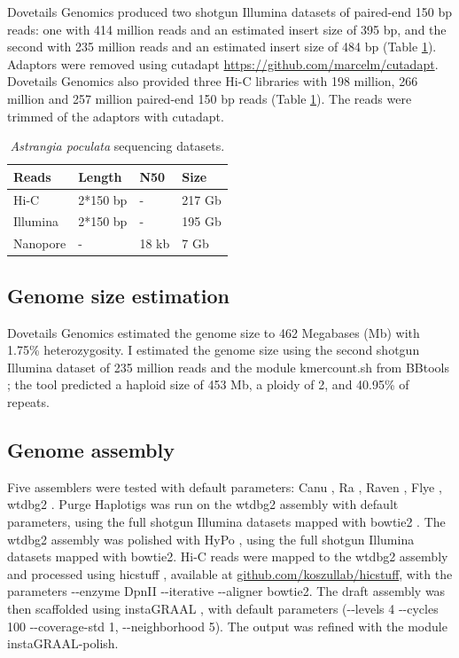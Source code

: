 Dovetails Genomics produced two shotgun Illumina datasets of paired-end 150 bp reads: one with 414 million reads and an estimated insert size of 395 bp, and the second with 235 million reads and an estimated insert size of 484 bp (Table \ref{tab:apoculata_datasets}). Adaptors were removed using cutadapt \url{https://github.com/marcelm/cutadapt}. \\

Dovetails Genomics also provided three Hi-C libraries with 198 million, 266 million and 257 million paired-end 150 bp reads (Table \ref{tab:apoculata_datasets}). The reads were trimmed of the adaptors with cutadapt.\\

\begin{table}[H]
\centering
\begin{tabular}{|l|l|l|l|}
\hline
\textbf{Reads} & \textbf{Length} & \textbf{N50} & \textbf{Size} \\
\hline
Hi-C & 2*150 bp & - & 217 Gb \\
Illumina & 2*150 bp & - & 195 Gb\\
Nanopore & - & 18 kb & 7 Gb \\
\hline
\end{tabular}
\caption{\textit{Astrangia poculata} sequencing datasets.}
\label{tab:apoculata_datasets}
\end{table}

\subsection{Genome size estimation}

Dovetails Genomics estimated the genome size to 462 Megabases (Mb) with 1.75\% heterozygosity. I estimated the genome size using the second shotgun Illumina dataset of 235 million reads and the module kmercount.sh from BBtools \cite{bbtools}; the tool predicted a haploid size of 453 Mb, a ploidy of 2, and 40.95\% of repeats. 

\subsection{Genome assembly}

Five assemblers were tested with default parameters: Canu \cite{canu}, Ra \cite{ra}, Raven \cite{raven}, Flye \cite{flye}, wtdbg2 \cite{wtdbg2}. Purge Haplotigs \cite{purge_haplotigs} was run on the wtdbg2 assembly with default parameters, using the full shotgun Illumina datasets mapped with bowtie2 \cite{bowtie2}. The wtdbg2 assembly was polished with HyPo \cite{hypo}, using the full shotgun Illumina datasets mapped with bowtie2. Hi-C reads were mapped to the wtdbg2 assembly and processed using hicstuff \cite{hicstuff}, available at \url{github.com/koszullab/hicstuff}, with the parameters -{}-enzyme DpnII -{}-iterative -{}-aligner bowtie2. The draft assembly was then scaffolded using instaGRAAL \cite{instagraal}, with default parameters (-{}-levels 4 -{}-cycles 100 -{}-coverage-std 1, -{}-neighborhood 5). The output was refined with the module instaGRAAL-polish. 

